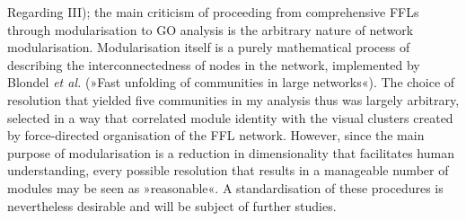 Regarding III); the main criticism of proceeding from comprehensive FFLs through modularisation to GO analysis is the arbitrary nature of network modularisation. Modularisation itself is a purely mathematical process of describing the interconnectedness of nodes in the network, implemented by Blondel \emph{et al.} (»Fast unfolding of communities in large networks«).\cite{Blondel2008} The choice of resolution that yielded five communities in my analysis thus was largely arbitrary, selected in a way that correlated module identity with the visual clusters created by force-directed organisation of the FFL network. However, since the main purpose of modularisation is a reduction in dimensionality that facilitates human understanding, every possible resolution that results in a manageable number of modules may be seen as »reasonable«. A standardisation of these procedures is nevertheless desirable and will be subject of further studies.

